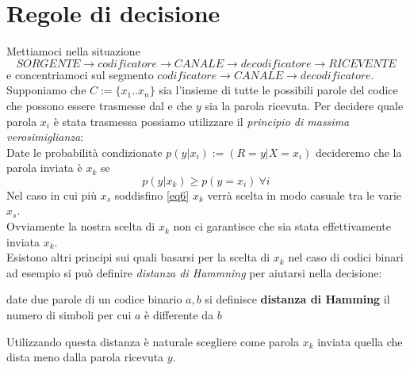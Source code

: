 \section{Regole di decisione}
Mettiamoci nella situazione
$$ SORGENTE \to codificatore \to CANALE \to decodificatore \to RICEVENTE$$
e concentriamoci sul segmento $codificatore \to CANALE \to decodificatore$.\\
Supponiamo che $C:=\{ x_1 ..x_n \}$ sia l'insieme di tutte le possibili parole del codice che possono essere trasmesse dal e che $y$ sia la parola ricevuta. Per decidere quale parola $x_i$ è stata trasmessa possiamo utilizzare il \textit{principio di massima verosimiglianza}:\\
Date le probabilità condizionate $p(y|x_i):=(R=y|X=x_i)$ decideremo che la parola inviata è $x_k$ se
\begin{equation} \label{eq6}
p(y|x_k )\geq p(y=x_i) \ \forall i
\end{equation}
Nel caso in cui più $x_s$ soddisfino \ref{eq6} $x_k$ verrà scelta in modo casuale tra le varie $x_s$.\\
Ovviamente la nostra scelta di $x_k$ non ci garantisce che sia stata effettivamente inviata $x_k$.\\
Esistono altri principi sui quali basarsi per la scelta di $x_k$ nel caso di codici binari ad esempio si può definire \textit{distanza di Hammning} per aiutarsi nella decisione:
\begin{defi}
date due parole di un codice binario $a,b$ si definisce \textbf{distanza di Hamming} il numero di simboli per cui $a$ è differente da $b$
\end{defi}
Utilizzando questa distanza è naturale scegliere come parola $x_k$ inviata quella che dista meno dalla parola ricevuta $y$.









